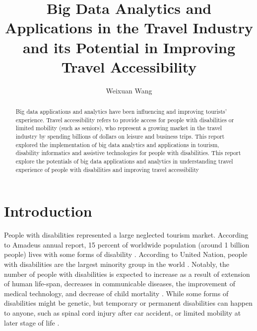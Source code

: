 \title{Big Data Analytics and Applications in the Travel Industry and its Potential in Improving Travel Accessibility}


\author{Weixuan Wang}
 

\renewcommand{\shortauthors}{Weixuan Wang}


\begin{abstract}
Big data applications and analytics have been influencing and improving tourists' experience. 
Travel accessibility refers to provide access for people with disabilities or limited mobility 
(such as seniors), who represent a growing market in the travel industry by spending billions 
of dollars on leisure and business trips. This report explored the implementation of big data 
analytics and applications in tourism, disability informatics and assistive technologies for 
people with disabilities. This report explore the potentials of big data applications and analytics 
in understanding travel experience of people with disabilities and improving travel accessibility 
\end{abstract}



\maketitle



\section{Introduction}
People with disabilities represented a large neglected tourism market. According to
Amadeus annual report, 15 percent of worldwide population (around 1 billion people) lives
with some forms of disability \cite{Ama}. According to United Nation, people with 
disabilities are the largest minority group in the world
\cite{Appleyard2005,DARCY2010816,Lex}. Notably, the number of people with disabilities is
expected to increase as a  result of extension of human life-span, decreases in
communicable diseases, the improvement of medical technology, and decrease of child
mortality \cite{SMITH1987376}.  While some forms of disabilities might be genetic, but
temporary or permanent disabilities can happen to anyone, such 
as spinal cord injury after car accident, or limited mobility at later stage of life
\cite{Lex}. 

